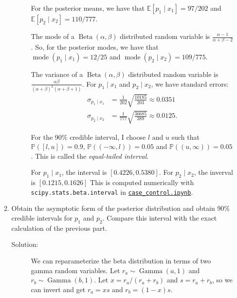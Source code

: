 \documentclass[letterpaper,11pt]{article}
\begin{document}
\begin{enumerate}
\begin{enumerate}
\begin{description}
      For the posterior means, we have that
      $\mathbb{E}\left[p_1 \mid x_1\right] = 97/202$ and
      $\mathbb{E}\left[p_2 \mid x_2\right] = 110/777$.

      The mode of a $\operatorname{Beta}\left(\alpha,\beta\right)$ distributed
      random variable is $\frac{\alpha - 1}{\alpha + \beta - 2}$. So, for the
      posterior modes, we have that
      $\operatorname{mode}\left(p_1 \mid x_1\right) = 12/25$ and
      $\operatorname{mode}\left(p_2 \mid x_2\right) = 109/775$.

      The variance of a $\operatorname{Beta}\left(\alpha,\beta\right)$
      distributed random variable is
      $\frac{\alpha\beta}{(\alpha+\beta)^2(\alpha + \beta + 1)}$. For
      $p_1 \mid x_1$ and $p_2 \mid x_2$, we have standard errors:      
      \begin{align*}
        \sigma_{p_1 \mid x_1}
        &= \frac{1}{202}\sqrt{\frac{10185}{203}} \approx 0.0351 \\
        \sigma_{p_2 \mid x_2}
        &= \frac{1}{777}\sqrt{\frac{36685}{389}} \approx 0.0125.
      \end{align*}

      For the 90\% credible interval, I choose $l$ and $u$ such that
      $\mathbb{P}\left(\left[l, u\right]\right) = 0.9$,
      $\mathbb{P}\left(\left(-\infty, l\right)\right) = 0.05$ and
      $\mathbb{P}\left(\left(u, \infty\right)\right) = 0.05$. This is called the
      \emph{equal-tailed interval}.

      For $p_1 \mid x_1$, the interval is $\left[0.4226, 0.5380\right]$. For
      $p_2 \mid x_2$, the inverval is $\left[0.1215, 0.1626\right]$ This is
      computed numerically with \texttt{scipy.stats.beta.interval} in
      \href{https://nbviewer.jupyter.org/github/ppham27/stat570/blob/master/hw5/case\_control.ipynb}{\texttt{case\_control.ipynb}}.
    \end{description}
  \item Obtain the asymptotic form of the posterior distribution and obtain 90\%
    credible intervals for $p_1$ and $p_2$. Compare this interval with the exact
    calculation of the previous part.

    \begin{description}
    \item[Solution:] We can reparameterize the beta distribution in terms of two
      gamma random variables. Let
      $r_a \sim \operatorname{Gamma}\left(a, 1\right)$ and
      $r_b \sim \operatorname{Gamma}\left(b, 1\right)$. Let
      $x = r_a/\left(r_a + r_b\right)$ and $s = r_a + r_b$, so we can invert and
      get $r_a = xs$ and $r_b = \left(1 - x\right)s$.


\end{description}
\end{enumerate}
\end{enumerate}
\end{document}
